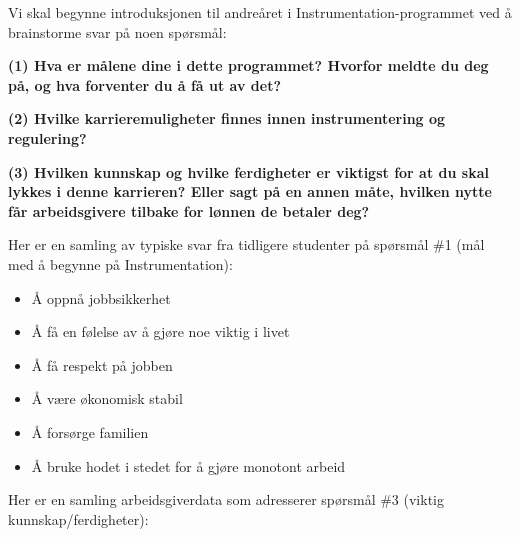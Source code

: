 
Vi skal begynne introduksjonen til andreåret i Instrumentation-programmet ved å brainstorme svar på noen spørsmål:

\vskip 20pt

\noindent
{\bf (1) Hva er målene dine i dette programmet?  Hvorfor meldte du deg på, og hva forventer du å få ut av det?}

\vskip 20pt

\noindent
{\bf (2) Hvilke karrieremuligheter finnes innen instrumentering og regulering?}

\vskip 20pt

\noindent
{\bf (3) Hvilken kunnskap og hvilke ferdigheter er viktigst for at du skal lykkes i denne karrieren?  Eller sagt på en annen måte, hvilken nytte får arbeidsgivere tilbake for lønnen de betaler deg?}

\vskip 20pt









\noindent
Her er en samling av typiske svar fra tidligere studenter på spørsmål \#1 (mål med å begynne på Instrumentation):

\begin{itemize}
\item{} Å oppnå jobbsikkerhet
\item{} Å få en følelse av å gjøre noe viktig i livet
\item{} Å få respekt på jobben
\item{} Å være økonomisk stabil
\item{} Å forsørge familien
\item{} Å bruke hodet i stedet for å gjøre monotont arbeid
\end{itemize}

\vskip 10pt

\noindent
Her er en samling arbeidsgiverdata som adresserer spørsmål \#3 (viktig kunnskap/ferdigheter):

